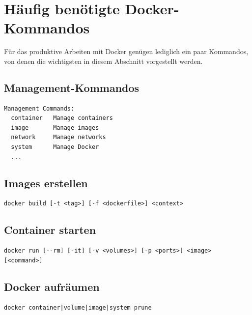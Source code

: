 \section{Häufig benötigte Docker-Kommandos}
\label{docker-kommandos}
Für das produktive Arbeiten mit Docker genügen lediglich ein paar Kommandos, von denen die wichtigsten in diesem Abschnitt vorgestellt werden.

\subsection{Management-Kommandos}
\begin{verbatim}
Management Commands:
  container   Manage containers
  image       Manage images
  network     Manage networks
  system      Manage Docker
  ...
\end{verbatim}

\subsection{Images erstellen}
\begin{verbatim}
docker build [-t <tag>] [-f <dockerfile>] <context>
\end{verbatim}

\subsection{Container starten}
\begin{verbatim}
docker run [--rm] [-it] [-v <volumes>] [-p <ports>] <image> [<command>]
\end{verbatim}

\subsection{Docker aufräumen}
\begin{verbatim}
docker container|volume|image|system prune
\end{verbatim}
